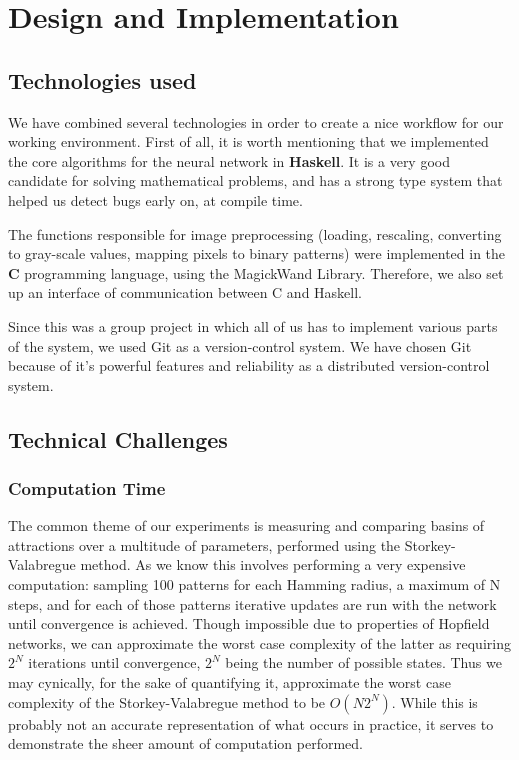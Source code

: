 \chapter{Design and Implementation}

\section{Technologies used}

We have combined several technologies in order to create a nice workflow for our working environment. First of all, it is worth mentioning that we implemented the core algorithms for the neural network in \textbf{Haskell}. It is a very good candidate for solving mathematical problems, and has a strong type system that helped us detect bugs early on, at compile time.

The functions responsible for image preprocessing (loading, rescaling, converting to gray-scale values, mapping pixels to binary patterns) were implemented in the \textbf{C} programming language, using the MagickWand Library. Therefore, we also set up an interface of communication between C and Haskell.

Since this was a group project in which all of us has to implement various parts of the system, we used Git as a version-control system. We have chosen Git because of it's powerful features and reliability as a distributed version-control system.





\section{Technical Challenges}

\subsection{Computation Time}


The common theme of our experiments is measuring and comparing basins of attractions over a multitude of parameters, performed using the Storkey-Valabregue method.  As we know this involves performing a very expensive computation: sampling 100 patterns for each Hamming radius, a maximum of N steps, and for each of those patterns iterative updates are run with the network until convergence is achieved. Though impossible due to properties of Hopfield networks, we can approximate the worst case complexity of the latter as requiring $2^N$ iterations until convergence, $2^N$ being the number of possible states. Thus we may cynically, for the sake of quantifying it, approximate the worst case complexity of the Storkey-Valabregue method to be $O(N2^N)$. While this is probably not an accurate representation of what occurs in practice, it serves to demonstrate the sheer amount of computation performed.

